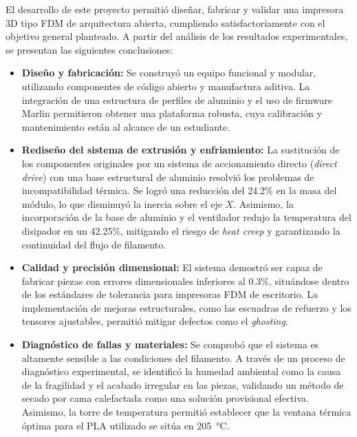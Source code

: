 \label{ch:conclusiones}

El desarrollo de este proyecto permitió diseñar, fabricar y validar una 
impresora 3D tipo FDM de arquitectura abierta, cumpliendo satisfactoriamente 
con el objetivo general planteado. A partir del análisis de los resultados 
experimentales, se presentan las siguientes conclusiones:

\begin{itemize}
    \item \textbf{Diseño y fabricación:} Se construyó un equipo funcional y 
    modular, utilizando componentes de código abierto y manufactura aditiva. 
    La integración de una estructura de perfiles de aluminio y el uso de 
    firmware Marlin permitieron obtener una plataforma robusta, cuya 
    calibración y mantenimiento están al alcance de un estudiante.

    \item \textbf{Rediseño del sistema de extrusión y enfriamiento:} La 
    sustitución de los componentes originales por un sistema de accionamiento 
    directo (\textit{direct drive}) con una base estructural de aluminio 
    resolvió los problemas de incompatibilidad térmica. Se logró una reducción 
    del 24.2\% en la masa del módulo, lo que disminuyó la inercia sobre el 
    eje \(X\). Asimismo, la incorporación de la base de aluminio y el 
    ventilador redujo la temperatura del disipador en un 42.25\%, mitigando 
    el riesgo de \textit{heat creep} y garantizando la continuidad del flujo 
    de filamento.

    \item \textbf{Calidad y precisión dimensional:} El sistema demostró ser 
    capaz de fabricar piezas con errores dimensionales inferiores al 0.3\%, 
    situándose dentro de los estándares de tolerancia para impresoras FDM de 
    escritorio. La implementación de mejoras estructurales, como las escuadras 
    de refuerzo y los tensores ajustables, permitió mitigar defectos como el 
    \textit{ghosting}.

    \item \textbf{Diagnóstico de fallas y materiales:} Se comprobó que el 
    sistema es altamente sensible a las condiciones del filamento. A través 
    de un proceso de diagnóstico experimental, se identificó la humedad 
    ambiental como la causa de la fragilidad y el acabado irregular en las 
    piezas, validando un método de secado por cama calefactada como una 
    solución provisional efectiva. Asimismo, la torre de temperatura permitió 
    establecer que la ventana térmica óptima para el PLA utilizado se sitúa 
    en \qty{205}{\celsius}.


\end{itemize}
